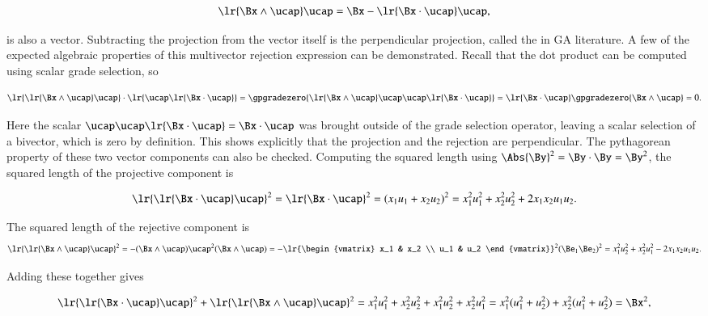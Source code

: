 \begin{dmath}\label{eqn:SimpleProducts2:700}
\lr{ \Bx \wedge \ucap } \ucap
=\Bx - \lr{ \Bx \cdot \ucap } \ucap,
\end{dmath}

is also a vector.  Subtracting the projection from the vector itself is the perpendicular projection, called the  in GA literature.  A few of the expected algebraic properties of this multivector rejection expression can be demonstrated.  Recall that the dot product can be computed using scalar grade selection, so

\begin{dmath}\label{eqn:SimpleProducts2:720}
\lr{ \lr{ \Bx \wedge \ucap } \ucap } \cdot \lr{ \ucap \lr{ \Bx \cdot \ucap } }
=
\gpgradezero{ \lr{ \Bx \wedge \ucap } \ucap \ucap \lr{ \Bx \cdot \ucap } }
=
\lr{ \Bx \cdot \ucap }
\gpgradezero{ \Bx \wedge \ucap }
= 0.
\end{dmath}

Here the scalar \( \ucap \ucap \lr{ \Bx \cdot \ucap } = \Bx \cdot \ucap \) was brought outside of the grade selection operator, leaving a scalar selection of a bivector, which is zero by definition.  This shows explicitly that the projection and the rejection are perpendicular.  The pythagorean property of these two vector components can also be checked.  Computing the squared length using \( \Abs{\By}^2 = \By \cdot \By = \By^2 \), the squared length of the projective component is

\begin{dmath}\label{eqn:SimpleProducts2:740}
\lr{ \lr{\Bx \cdot \ucap } \ucap }^2
=
\lr{\Bx \cdot \ucap }^2
=
(x_1 u_1 + x_2 u_2)^2
=
x_1^2 u_1^2 + x_2^2 u_2^2 + 2 x_1 x_2 u_1 u_2.
\end{dmath}

The squared length of the rejective component is
\begin{dmath}\label{eqn:SimpleProducts2:760}
\lr{ \lr{\Bx \wedge \ucap } \ucap }^2
=
-(\Bx \wedge \ucap) \ucap^2 (\Bx \wedge \ucap)
=
-
\lr{\begin{vmatrix}
   x_1 & x_2 \\
   u_1 & u_2
\end{vmatrix}}^2
(\Be_1 \Be_2)^2
=
x_1^2 u_2^2 + x_2^2 u_1^2 - 2 x_1 x_2 u_1 u_2.
\end{dmath}

Adding these together gives

\begin{dmath}\label{eqn:SimpleProducts2:780}
\lr{ \lr{\Bx \cdot \ucap } \ucap }^2 + \lr{ \lr{\Bx \wedge \ucap } \ucap }^2
=
x_1^2 u_1^2 + x_2^2 u_2^2
+x_1^2 u_2^2 + x_2^2 u_1^2
=
x_1^2 ( u_1^2 + u_2^2 )
+
x_2^2 ( u_1^2 + u_2^2 )
=
\Bx^2,
\end{dmath}

